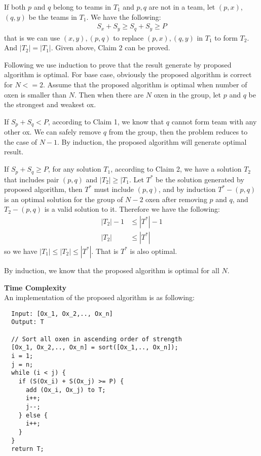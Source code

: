 \documentclass{article}
\newcommand{\Complexity}{\vspace{0.3cm} \noindent\textbf{Time Complexity} \\}
\begin{document}
If both $p$ and $q$ belong to teams in $T_1$ and $p, q$ are not in a team, let $(p, x)$, $(q, y)$ be
the teams in $T_1$. We have the following:
\begin{align}
  S_x + S_y \geq S_q + S_y \geq P 
\end{align}
that is we can use $(x, y), (p, q)$ to replace $(p, x), (q, y)$ in $T_1$ to form $T_2$. And $|T_2| =
|T_1|$.
Given above, Claim 2 can be proved.

\vspace{0.3cm}
Following we use induction to prove that the result generate by proposed algorithm is optimal.
For base case, obviously the proposed algorithm is correct for $N <= 2$.  
Assume that the proposed algorithm is optimal when number of oxen is smaller than $N$. Then when
there are $N$ oxen in the group, let $p$ and $q$ be the strongest and weakest ox.

If $S_p + S_q < P$, according to Claim 1, we know that $q$ cannot form team with any other ox. We
can safely remove $q$ from the group, then the problem reduces to the case of $N-1$. By induction,
the proposed algorithm will generate optimal result.

If $S_p + S_q \geq P$, for any solution $T_1$, according to Claim 2, we have a solution $T_2$ that
includes pair $(p, q)$ and $|T_2| \geq |T_1$. Let $T^*$ be the solution generated by proposed
algorithm, then $T^*$ must include $(p, q)$, and by induction $T^* - (p, q)$ is an optimal solution for the group
of $N-2$ oxen after removing $p$ and $q$, and $T_2 - (p, q)$ is a valid solution to it. Therefore we
have the following:
\begin{align}
  |T_2| - 1 & \leq |T^*| - 1 \\
  |T_2| & \leq |T^*|
\end{align}
so we have $|T_1| \leq |T_2| \leq |T^*|$. That is $T^*$ is also optimal.

By induction, we know that the proposed algorithm is optimal for all $N$.

\Complexity
An implementation of the proposed algorithm is as following:
\begin{verbatim}
  Input: [Ox_1, Ox_2,.., Ox_n]
  Output: T
  
  // Sort all oxen in ascending order of strength
  [Ox_1, Ox_2,.., Ox_n] = sort([Ox_1,.., Ox_n]);
  i = 1;
  j = n;
  while (i < j) {
    if (S(Ox_i) + S(Ox_j) >= P) {
      add (Ox_i, Ox_j) to T;
      i++;
      j--;
    } else {
      i++;
    }
  }
  return T;
\end{verbatim}
\end{document}
